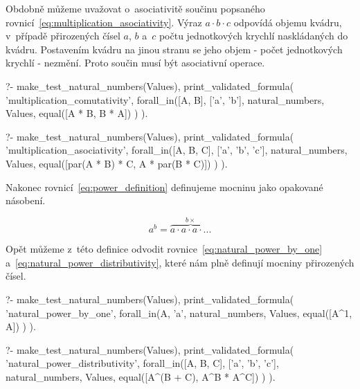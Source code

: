 Obdobně můžeme uvažovat o~asociativitě součinu popsaného rovnicí~\eqref{eq:multiplication_asociativity}. Výraz \(a \cdot b \cdot c\) odpovídá objemu kvádru, v~případě přirozených čísel \(a\), \(b\) a~\(c\) počtu jednotkových krychlí naskládaných do kvádru. Postavením kvádru na jinou stranu se jeho objem - počet jednotkových krychlí - nezmění. Proto součin musí být asociativní operace.

\begin{fact}
\begin{prolog}
?-	make_test_natural_numbers(Values),
	print_validated_formula(
		'multiplication_comutativity',
		forall_in([A, B], ['a', 'b'], natural_numbers, Values,
			equal([A * B, B * A])
		)
	).				
\end{prolog}
\begin{prolog}
?-	make_test_natural_numbers(Values),
	print_validated_formula(
		'multiplication_asociativity',
		forall_in([A, B, C], ['a', 'b', 'c'], natural_numbers, Values,
			equal([par(A * B) * C, A * par(B * C)])
		)
	).				
\end{prolog}
\end{fact}

Nakonec rovnicí~\eqref{eq:power_definition} definujeme mocninu jako opakované násobení.

\begin{equation}
\label{eq:power_definition}
a^b = \overbrace{a \cdot a \cdot a \cdot ...}^{b \times}
\end{equation}

Opět můžeme z~této definice odvodit rovnice~\eqref{eq:natural_power_by_one} a~\eqref{eq:natural_power_distributivity}, které nám plně definují mocniny přirozených čísel.

\begin{fact}
\begin{prolog}
?-	make_test_natural_numbers(Values),
	print_validated_formula(
		'natural_power_by_one',
		forall_in(A, 'a', natural_numbers, Values,
			equal([A^1, A])
		)
	).				
\end{prolog}
\begin{prolog}
?-	make_test_natural_numbers(Values),
	print_validated_formula(
		'natural_power_distributivity',
		forall_in([A, B, C], ['a', 'b', 'c'], natural_numbers, Values,
			equal([A^(B + C), A^B * A^C])
		)
	).				
\end{prolog}
\end{fact}

